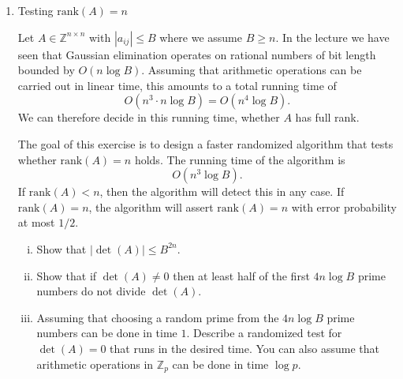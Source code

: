 \documentclass[11pt]{article}
\newcommand{\setR}{\mathbb{R}}
\newcommand{\setZ}{\mathbb{Z}}
\newcommand{\rank}{\mathrm{rank}}
\begin{document}
\begin{enumerate}[1)]
\item {Testing ${\rank(A) = n}$}

\smallskip
\noindent 
Let $A ∈ ℤ^{n ×n}$ with $|a_{ij}| ≤ B$ where we assume $B ≥n$. In the lecture we have seen that Gaussian elimination operates on rational numbers of bit length bounded by $O(n \log B)$. Assuming that arithmetic operations can be carried out in linear time, this amounts to a total running time of
\begin{displaymath}
  O(n ^3 ⋅n  \log B) =  O(n ^4  \log B). 
\end{displaymath}
We can therefore decide in this running time, whether $A$ has full rank. 

The goal of this exercise is to design a faster randomized algorithm that tests whether $\rank(A) =n$ holds. The running time of the algorithm is
\begin{displaymath}
    O(n ^3  \log B). 
\end{displaymath}
If $\rank(A) <n$, then the algorithm will detect this in any case.
If $\rank(A) =n$, the algorithm will assert $\rank(A) = n$ with error probability at most $1/2$.  

\begin{enumerate}[i)]
\item Show that $|\det(A)| ≤ B^{2n}$.
\item Show that if $\det(A) ≠0$ then at least half of the first $4n\log B$ prime numbers do not divide $\det(A)$.
\item Assuming that choosing a random prime from the $4n\log B$ prime numbers can be done in time $1$.
Describe a randomized test for $\det(A) =0$ that runs in the desired time. You can also assume that arithmetic operations in $ℤ_p$ can be done in time $\log p$. 
\end{enumerate}
  


\end{enumerate}
\end{document}
